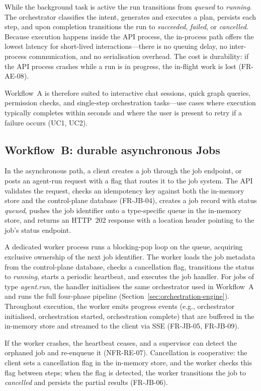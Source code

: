 \documentclass[a4paper]{sapthesis}
\begin{document}
While the background task is active the run transitions from
\emph{queued} to \emph{running}.  The orchestrator classifies the intent,
generates and executes a plan, persists each step, and upon completion
transitions the run to \emph{succeeded}, \emph{failed}, or \emph{cancelled}.
Because execution happens inside the API process, the in-process path
offers the lowest latency for short-lived interactions---there is no
queuing delay, no inter-process communication, and no serialisation
overhead.  The cost is durability: if the API process crashes while a run
is in progress, the in-flight work is lost (FR-AE-08).

Workflow~A is therefore suited to interactive chat sessions, quick graph
queries, permission checks, and single-step orchestration tasks---use cases
where execution typically completes within seconds and where the user is
present to retry if a failure occurs (UC1, UC2).

\subsection{Workflow~B: durable asynchronous Jobs}

In the asynchronous path, a client creates a job through the job endpoint,
or posts an agent-run request with a flag that routes it to the job system.
The API validates the request, checks an idempotency key against both the
in-memory store and the control-plane database (FR-JB-04), creates a job
record with status \emph{queued}, pushes the job identifier onto a type-specific
queue in the in-memory store, and returns an HTTP~202 response with a
location header pointing to the job's status endpoint.

A dedicated worker process runs a blocking-pop loop on the queue, acquiring
exclusive ownership of the next job identifier.  The worker loads the job
metadata from the control-plane database, checks a cancellation flag,
transitions the status to \emph{running}, starts a periodic heartbeat, and
executes the job handler.  For jobs of type \emph{agent.run}, the handler
initialises the same orchestrator used in Workflow~A and runs the full
four-phase pipeline (Section~\ref{sec:orchestration-engine}).  Throughout
execution, the worker emits progress events (e.g., orchestrator
initialised, orchestration started, orchestration complete) that are
buffered in the in-memory store and streamed to the client via SSE
(FR-JB-05, FR-JB-09).

If the worker crashes, the heartbeat ceases, and a supervisor can detect
the orphaned job and re-enqueue it (NFR-RE-07).  Cancellation is
cooperative: the client sets a cancellation flag in the in-memory store,
and the worker checks this flag between steps; when the flag is detected,
the worker transitions the job to \emph{cancelled} and persists the
partial results (FR-JB-06).
\end{document}
